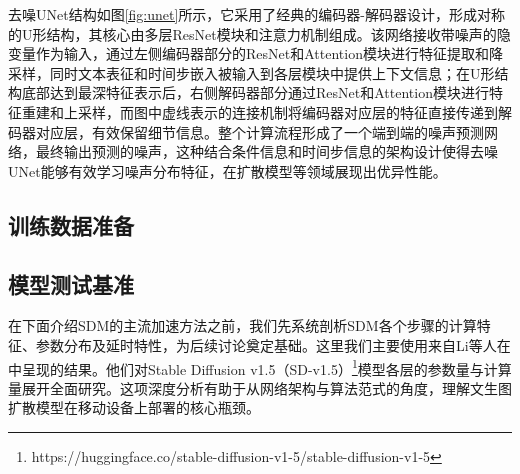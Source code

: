 \documentclass[11pt,a4paper,UTF8]{ctexart}
\begin{document}
去噪UNet结构如图\ref{fig:unet}所示，它采用了经典的编码器-解码器设计，形成对称的U形结构，其核心由多层ResNet模块和注意力机制组成。该网络接收带噪声的隐变量作为输入，通过左侧编码器部分的ResNet和Attention模块进行特征提取和降采样，同时文本表征和时间步嵌入被输入到各层模块中提供上下文信息；在U形结构底部达到最深特征表示后，右侧解码器部分通过ResNet和Attention模块进行特征重建和上采样，而图中虚线表示的连接机制将编码器对应层的特征直接传递到解码器对应层，有效保留细节信息。整个计算流程形成了一个端到端的噪声预测网络，最终输出预测的噪声，这种结合条件信息和时间步信息的架构设计使得去噪UNet能够有效学习噪声分布特征，在扩散模型等领域展现出优异性能。
\fi

\subsection{训练数据准备}


\subsection{模型测试基准}


\newpage



在下面介绍SDM的主流加速方法之前，我们先系统剖析SDM各个步骤的计算特征、参数分布及延时特性，为后续讨论奠定基础。这里我们主要使用来自Li等人在\cite{li2023snapfusion}中呈现的结果。他们对Stable Diffusion v1.5（SD-v1.5）\footnote{https://huggingface.co/stable-diffusion-v1-5/stable-diffusion-v1-5}模型各层的参数量与计算量展开全面研究。这项深度分析有助于从网络架构与算法范式的角度，理解文生图扩散模型在移动设备上部署的核心瓶颈。
\end{document}
